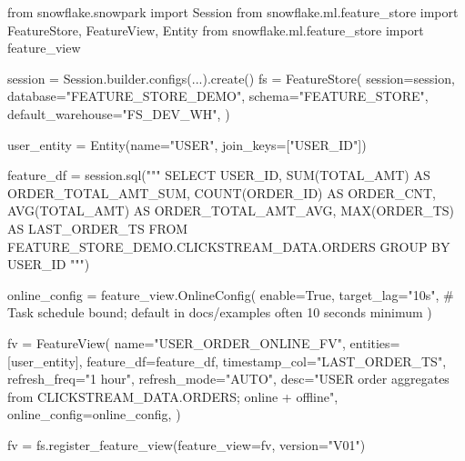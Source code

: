 \documentclass[
  letterpaper,
  DIV=11,
  numbers=noendperiod]{scrreprt}
\newenvironment{Shaded}{\begin{snugshade}}{\end{snugshade}}
\newcommand{\CommentTok}[1]{\textcolor[rgb]{0.37,0.37,0.37}{#1}}
\newcommand{\ImportTok}[1]{\textcolor[rgb]{0.00,0.46,0.62}{#1}}
\newcommand{\NormalTok}[1]{\textcolor[rgb]{0.00,0.23,0.31}{#1}}
\newcommand{\OperatorTok}[1]{\textcolor[rgb]{0.37,0.37,0.37}{#1}}
\newcommand{\StringTok}[1]{\textcolor[rgb]{0.13,0.47,0.30}{#1}}
\newcommand{\VariableTok}[1]{\textcolor[rgb]{0.07,0.07,0.07}{#1}}
\begin{document}
\begin{Shaded}
\begin{Highlighting}[]
\ImportTok{from}\NormalTok{ snowflake.snowpark }\ImportTok{import}\NormalTok{ Session}
\ImportTok{from}\NormalTok{ snowflake.ml.feature\_store }\ImportTok{import}\NormalTok{ FeatureStore, FeatureView, Entity}
\ImportTok{from}\NormalTok{ snowflake.ml.feature\_store }\ImportTok{import}\NormalTok{ feature\_view}

\NormalTok{session }\OperatorTok{=}\NormalTok{ Session.builder.configs(...).create()}
\NormalTok{fs }\OperatorTok{=}\NormalTok{ FeatureStore(}
\NormalTok{    session}\OperatorTok{=}\NormalTok{session,}
\NormalTok{    database}\OperatorTok{=}\StringTok{"FEATURE\_STORE\_DEMO"}\NormalTok{,}
\NormalTok{    schema}\OperatorTok{=}\StringTok{"FEATURE\_STORE"}\NormalTok{,}
\NormalTok{    default\_warehouse}\OperatorTok{=}\StringTok{"FS\_DEV\_WH"}\NormalTok{,}
\NormalTok{)}

\NormalTok{user\_entity }\OperatorTok{=}\NormalTok{ Entity(name}\OperatorTok{=}\StringTok{"USER"}\NormalTok{, join\_keys}\OperatorTok{=}\NormalTok{[}\StringTok{"USER\_ID"}\NormalTok{])}

\NormalTok{feature\_df }\OperatorTok{=}\NormalTok{ session.sql(}\StringTok{"""}
\StringTok{    SELECT}
\StringTok{        USER\_ID,}
\StringTok{        SUM(TOTAL\_AMT) AS ORDER\_TOTAL\_AMT\_SUM,}
\StringTok{        COUNT(ORDER\_ID) AS ORDER\_CNT,}
\StringTok{        AVG(TOTAL\_AMT) AS ORDER\_TOTAL\_AMT\_AVG,}
\StringTok{        MAX(ORDER\_TS) AS LAST\_ORDER\_TS}
\StringTok{    FROM FEATURE\_STORE\_DEMO.CLICKSTREAM\_DATA.ORDERS}
\StringTok{    GROUP BY USER\_ID}
\StringTok{"""}\NormalTok{)}

\NormalTok{online\_config }\OperatorTok{=}\NormalTok{ feature\_view.OnlineConfig(}
\NormalTok{    enable}\OperatorTok{=}\VariableTok{True}\NormalTok{,}
\NormalTok{    target\_lag}\OperatorTok{=}\StringTok{"10s"}\NormalTok{,  }\CommentTok{\# Task schedule bound; default in docs/examples often 10 seconds minimum}
\NormalTok{)}

\NormalTok{fv }\OperatorTok{=}\NormalTok{ FeatureView(}
\NormalTok{    name}\OperatorTok{=}\StringTok{"USER\_ORDER\_ONLINE\_FV"}\NormalTok{,}
\NormalTok{    entities}\OperatorTok{=}\NormalTok{[user\_entity],}
\NormalTok{    feature\_df}\OperatorTok{=}\NormalTok{feature\_df,}
\NormalTok{    timestamp\_col}\OperatorTok{=}\StringTok{"LAST\_ORDER\_TS"}\NormalTok{,}
\NormalTok{    refresh\_freq}\OperatorTok{=}\StringTok{"1 hour"}\NormalTok{,}
\NormalTok{    refresh\_mode}\OperatorTok{=}\StringTok{"AUTO"}\NormalTok{,}
\NormalTok{    desc}\OperatorTok{=}\StringTok{"USER order aggregates from CLICKSTREAM\_DATA.ORDERS; online + offline"}\NormalTok{,}
\NormalTok{    online\_config}\OperatorTok{=}\NormalTok{online\_config,}
\NormalTok{)}

\NormalTok{fv }\OperatorTok{=}\NormalTok{ fs.register\_feature\_view(feature\_view}\OperatorTok{=}\NormalTok{fv, version}\OperatorTok{=}\StringTok{"V01"}\NormalTok{)}
\end{Highlighting}
\end{Shaded}
\end{document}
